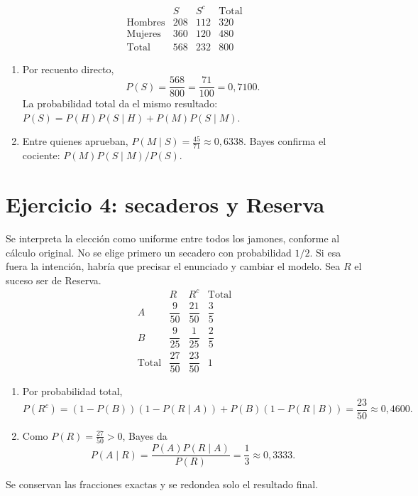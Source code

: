 \documentclass[11pt]{article}
\begin{document}
\[\begin{array}{c|rr|r}&S&S^c&\text{Total}\\\hline\text{Hombres}&208&112&320\\\text{Mujeres}&360&120&480\\\hline\text{Total}&568&232&800\end{array}\]
\begin{enumerate}[label=(\alph*)]\item Por recuento directo,\[P(S)=\frac{568}{800}=\boxed{\frac{71}{100}}=0,7100.\]
La probabilidad total da el mismo resultado: $P(S)=P(H)P(S\mid H)+P(M)P(S\mid M)$.
\item Entre quienes aprueban, $P(M\mid S)=\boxed{\frac{45}{71}}\approx 0,6338$. Bayes confirma el cociente: $P(M)P(S\mid M)/P(S)$.
\end{enumerate}\clearpage\section*{Ejercicio 4: secaderos y Reserva}
Se interpreta la elección como uniforme entre todos los jamones, conforme al cálculo original. No se elige primero un secadero con probabilidad $1/2$. Si esa fuera la intención, habría que precisar el enunciado y cambiar el modelo. Sea $R$ el suceso ser de Reserva.
\[\begin{array}{c|cc|c}&R&R^c&\text{Total}\\\hline A&\dfrac{9}{50}&\dfrac{21}{50}&\dfrac{3}{5}\\ B&\dfrac{9}{25}&\dfrac{1}{25}&\dfrac{2}{5}\\\hline\text{Total}&\dfrac{27}{50}&\dfrac{23}{50}&1\end{array}\]
\begin{enumerate}[label=(\alph*)]\item Por probabilidad total,\[P(R^c)=(1-P(B))(1-P(R\mid A))+P(B)(1-P(R\mid B))=\boxed{\frac{23}{50}}\approx 0,4600.\]
\item Como $P(R)=\frac{27}{50}>0$, Bayes da\[P(A\mid R)=\frac{P(A)P(R\mid A)}{P(R)}=\boxed{\frac{1}{3}}\approx 0,3333.\]
\end{enumerate}
Se conservan las fracciones exactas y se redondea solo el resultado final.
\end{document}
